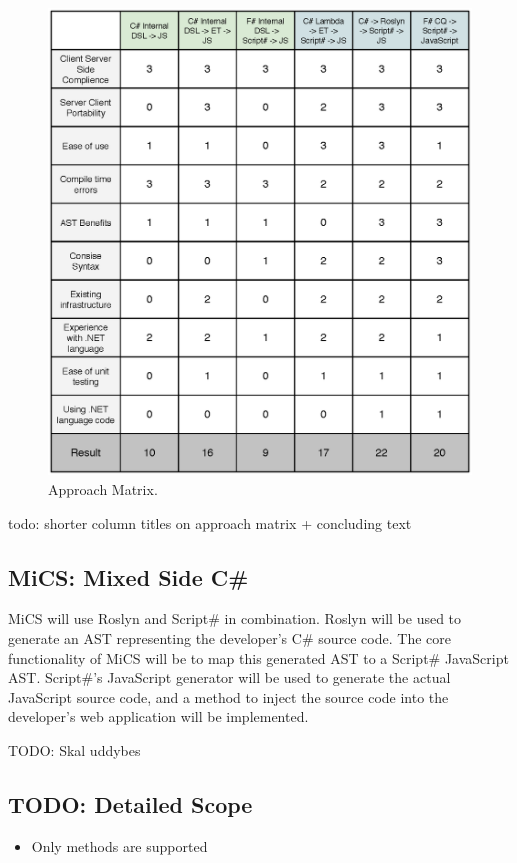 		\begin{figure}[H]
			\begin{center}
				\centerline{\includegraphics[width=16cm]{resources/images/approachmatrix.eps}}
			\end{center}
			\caption{Approach Matrix.}
			\label{approachMatrix}
		\end{figure}


	todo: shorter column titles on approach matrix + concluding text


	\subsection{MiCS: Mixed Side C\#} %
	\label{sub:mics_mixed_side_csharp}
	MiCS will use Roslyn and Script\# in combination. Roslyn will be used to generate an AST representing the developer's C\# source code. The core functionality of MiCS will be to map this generated AST to a Script\# JavaScript AST. Script\#'s JavaScript generator will be used to generate the actual JavaScript source code, and a method to inject the source code into the developer's web application will be implemented.

	TODO: Skal uddybes

	\subsection{TODO: Detailed Scope} %
	\label{sub:detailed_scope}
	
		\begin{itemize}
			\item Only methods are supported
		\end{itemize}

